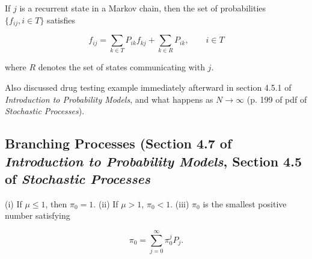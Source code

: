 \begin{proposition}If \(j\) is a recurrent state in a Markov chain, then the set of probabilities \(\{f_{ij}, i \in T\}\) satisfies

\[
f_{ij} = \sum_{k \in T} P_{ik} f_{kj} + \sum_{k \in R} P_{ik}, \qquad i \in T
\]

where \(R\) denotes the set of states communicating with \(j\).

\end{proposition}


\begin{example}\label{stoch.gamb.ruin}

Also discussed drug testing example immediately afterward in section 4.5.1 of \textit{Introduction to Probability Models}, and what happens as \(N \to \infty\) (p. 199 of pdf of \textit{Stochastic Processes}).
\end{example}

\subsection{Branching Processes (Section 4.7 of \textit{Introduction to Probability Models}, Section 4.5 of \textit{Stochastic Processes}}

\begin{proposition}\label{stoch.sp.4.5.1}
(i) If \(\mu \leq 1\), then \(\pi_0 = 1\). (ii) If \(\mu > 1\), \(\pi_0 < 1\). (iii) \(\pi_0\) is the smallest positive number satisfying 

\[
\pi_0 = \sum_{j =0}^\infty \pi_0^j P_j.
\]
\end{proposition}

